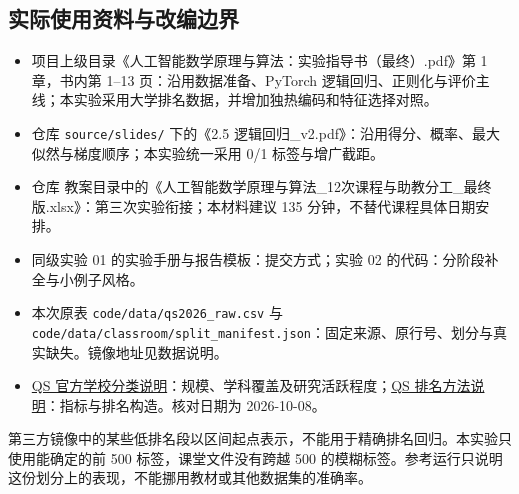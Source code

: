 \documentclass[UTF8,a4paper,11pt,fontset=fandol]{ctexart}
\newcommand{\file}[1]{\nolinkurl{#1}}
\begin{document}
\subsection{实际使用资料与改编边界}
\begin{itemize}
\item 项目上级目录《人工智能数学原理与算法：实验指导书（最终）.pdf》第 1 章，书内第 1--13 页：沿用数据准备、PyTorch 逻辑回归、正则化与评价主线；本实验采用大学排名数据，并增加独热编码和特征选择对照。
\item 仓库 \file{source/slides/} 下的《2.5 逻辑回归\_v2.pdf》：沿用得分、概率、最大似然与梯度顺序；本实验统一采用 0/1 标签与增广截距。
\item 仓库 教案目录中的《人工智能数学原理与算法\_12次课程与助教分工\_最终版.xlsx》：第三次实验衔接；本材料建议 135 分钟，不替代课程具体日期安排。
\item 同级实验 01 的实验手册与报告模板：提交方式；实验 02 的代码：分阶段补全与小例子风格。
\item 本次原表 \file{code/data/qs2026_raw.csv} 与 \file{code/data/classroom/split_manifest.json}：固定来源、原行号、划分与真实缺失。镜像地址见数据说明。
\item \href{https://support.qs.com/hc/en-gb/articles/360021876820-QS-Institution-Classifications}{QS 官方学校分类说明}：规模、学科覆盖及研究活跃程度；\href{https://www.qs.com/insights/world-university-rankings-methodology}{QS 排名方法说明}：指标与排名构造。核对日期为 2026-10-08。
\end{itemize}
第三方镜像中的某些低排名段以区间起点表示，不能用于精确排名回归。本实验只使用能确定的前 500 标签，课堂文件没有跨越 500 的模糊标签。参考运行只说明这份划分上的表现，不能挪用教材或其他数据集的准确率。
\end{document}
